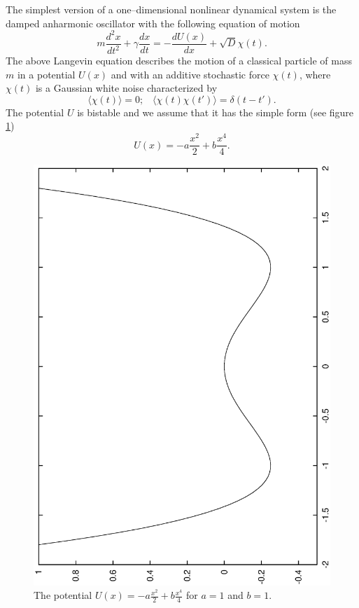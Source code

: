 The simplest version of a one--dimensional nonlinear dynamical system 
is the damped anharmonic oscillator with the following equation of motion
\begin{equation}
m \frac{d^2x}{dt^2} + \gamma \frac{dx}{dt} = - \frac{dU(x)}{dx} 
 + \sqrt{D} \chi(t).
\end{equation}
The above Langevin equation describes the motion of a classical particle of
mass $m$ in a potential $U(x)$ and with an additive stochastic force
$\chi(t)$,
where $\chi(t)$
is a Gaussian white noise characterized by
\begin{equation}
\langle \chi(t) \rangle =0; \;\;\; \langle \chi(t) \chi(t')\rangle =
\delta(t - t').
\end{equation}
The potential $U$ is bistable and we assume that it has the simple form
(see figure \ref{fig:BistablePotential})
\begin{equation}
U(x) = -a \frac{x^2}{2} + b \frac{x^4}{4}.
\end{equation}
\begin{figure}[htbp]
  \begin{center}
    \includegraphics[angle=-90,width=\textwidth]{../Figures/BistablePotential.eps}
    \caption{The potential $U(x)=-a \frac{x^2}{2} + b \frac{x^4}{4}$ 
      for $a=1$ and $b=1$.}
    \label{fig:BistablePotential}
  \end{center}
\end{figure}
